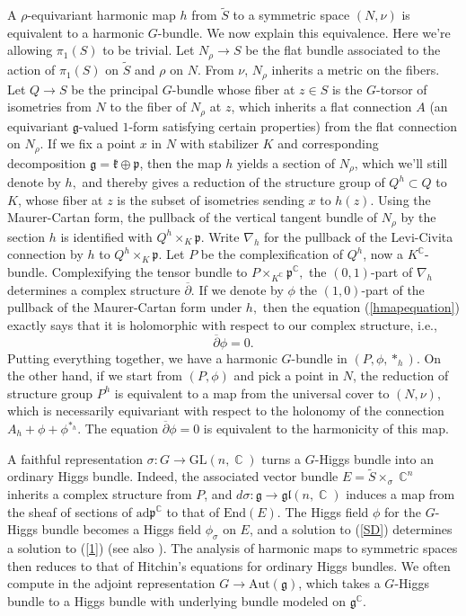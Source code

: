 \documentclass[10pt]{amsart}
\newcommand{\p}{\mathfrak{p}}
\newcommand{\g}{\mathfrak{g}}
\newcommand{\kk}{\mathfrak{k}}
\theoremstyle{definition}
\DeclareMathOperator{\C}{\mathbb{C}}
\begin{document}
A $\rho$-equivariant harmonic map $h$ from $\tilde{S}$ to a symmetric space $(N,\nu)$ is equivalent to a harmonic $G$-bundle. We now explain this equivalence. Here we're allowing $\pi_1(S)$ to be trivial. Let $N_\rho\to S$ be the flat bundle associated to the action of $\pi_1(S)$ on $\tilde{S}$ and $\rho$ on $N$. From $\nu$, $N_\rho$ inherits a metric on the fibers. Let $Q\to S$ be the principal $G$-bundle whose fiber at $z \in S$ is the $G$-torsor of isometries from $N$ to the fiber of $N_\rho$ at $z$, which inherits a flat connection $A$ (an equivariant $\g$-valued $1$-form satisfying certain properties) from the flat connection on $N_\rho$. If we fix a point $x$ in $N$ with stabilizer $K$ and corresponding decomposition $\g = \kk\oplus \p$, then the map $h$ yields a section of $N_\rho$, which we'll still denote by $h,$ and thereby gives a reduction of the structure group of  $Q^h\subset Q$ to $K$, whose fiber at $z$ is the subset of isometries sending $x$ to $h(z)$. Using the Maurer-Cartan form, the pullback of the vertical tangent bundle of $N_\rho$ by the section $h$ is identified with $Q^h \times_K \p$. Write $\nabla_h$ for the pullback of the Levi-Civita connection by $h$ to $Q^h \times_K \p$. Let $P$ be the complexification of $Q^h$, now a $K^{\C}$-bundle. Complexifying the tensor bundle to $P \times_{K^{\C}} \p^{\C},$ the $(0,1)$-part of $\nabla_h$ determines a complex structure $\overline{\partial}$. If we denote by $\phi$ the $(1,0)$-part of the pullback of the Maurer-Cartan form under $h,$ then the equation (\ref{hmapequation}) exactly says that it is holomorphic with respect to our complex structure, i.e., $$\overline{\partial}\phi=0.$$
Putting everything together, we have a harmonic $G$-bundle in $(P,\phi,*_h)$. On the other hand, if we start from $(P,\phi)$ and pick a point in $N$, the reduction of structure group $P^h$ is equivalent to a map from the universal cover to $(N,\nu),$ which is necessarily equivariant with respect to the holonomy of the connection $A_h + \phi+\phi^{*_h}.$ The equation $\overline{\partial}\phi=0$ is equivalent to the harmonicity of this map.


A faithful representation $\sigma:G\to \textrm{GL}(n,\C)$ turns a $G$-Higgs bundle into an ordinary Higgs bundle. Indeed, the associated vector bundle $E=\tilde{S}\times_{\sigma} \C^n$ inherits a complex structure from $P$, and $d\sigma:\g\to \mathfrak{gl}(n,\C)$ induces a map from the sheaf of sections of $\textrm{ad}\p^{\C}$ to that of $\textrm{End}(E)$. The Higgs field $\phi$ for the $G$-Higgs bundle becomes a Higgs field $\phi_\sigma$ on $E$, and a solution to (\ref{SD}) determines a solution to (\ref{1}) (see also \cite[section 2.4]{SS}). The analysis of harmonic maps to symmetric spaces then reduces to that of Hitchin's equations for ordinary Higgs bundles. We often compute in the adjoint representation $G\to \textrm{Aut}(\g)$, which takes a $G$-Higgs bundle to a Higgs bundle with underlying bundle modeled on $\g^{\C}$.  
\end{document}
